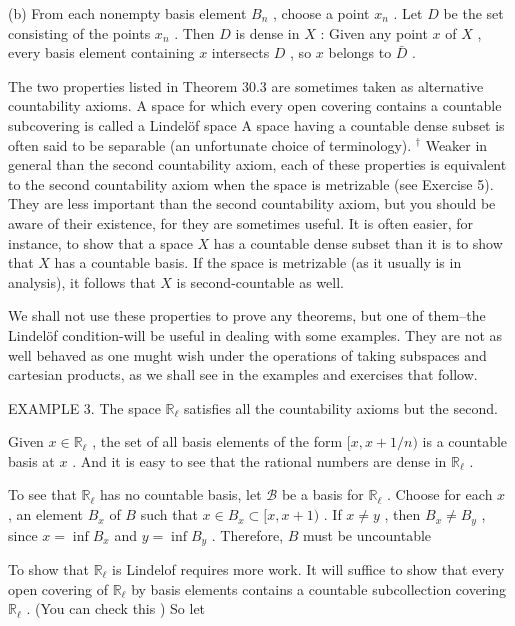 \documentclass[10pt]{article}
\begin{document}
(b) From each nonempty basis element \({B}_{n}\) , choose a point \({x}_{n}\) . Let \(D\) be the set consisting of the points \({x}_{n}\) . Then \(D\) is dense in \(X\) : Given any point \(x\) of \(X\) , every basis element containing \(x\) intersects \(D\) , so \(x\) belongs to \(\bar{D}\) .

The two properties listed in Theorem 30.3 are sometimes taken as alternative countability axioms. A space for which every open covering contains a countable subcovering is called a Lindelöf space A space having a countable dense subset is often said to be separable (an unfortunate choice of terminology). \({}^{ \dagger  }\) Weaker in general than the second countability axiom, each of these properties is equivalent to the second countability axiom when the space is metrizable (see Exercise 5). They are less important than the second countability axiom, but you should be aware of their existence, for they are sometimes useful. It is often easier, for instance, to show that a space \(X\) has a countable dense subset than it is to show that \(X\) has a countable basis. If the space is metrizable (as it usually is in analysis), it follows that \(X\) is second-countable as well.

We shall not use these properties to prove any theorems, but one of them--the Lindelöf condition-will be useful in dealing with some examples. They are not as well behaved as one mught wish under the operations of taking subspaces and cartesian products, as we shall see in the examples and exercises that follow.

EXAMPLE 3. The space \({\mathbb{R}}_{\ell }\) satisfies all the countability axioms but the second.

Given \(x \in  {\mathbb{R}}_{\ell }\) , the set of all basis elements of the form \(\lbrack x,x + 1/n)\) is a countable basis at \(x\) . And it is easy to see that the rational numbers are dense in \({\mathbb{R}}_{\ell }\) .

To see that \({\mathbb{R}}_{\ell }\) has no countable basis, let \(\mathcal{B}\) be a basis for \({\mathbb{R}}_{\ell }\) . Choose for each \(x\) , an element \({B}_{x}\) of \(B\) such that \(x \in  {B}_{x} \subset  \lbrack x,x + 1)\) . If \(x \neq  y\) , then \({B}_{x} \neq  {B}_{y}\) , since \(x = \inf {B}_{x}\) and \(y = \inf {B}_{y}\) . Therefore, \(B\) must be uncountable

To show that \({\mathbb{R}}_{\ell }\) is Lindelof requires more work. It will suffice to show that every open covering of \({\mathbb{R}}_{\ell }\) by basis elements contains a countable subcollection covering \({\mathbb{R}}_{\ell }\) . (You can check this ) So let
\end{document}
